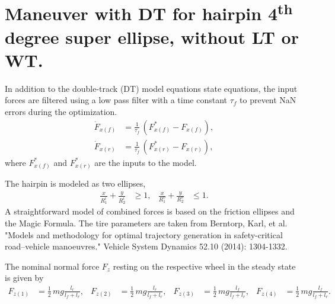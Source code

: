 \chapter[Double-Track Maneuver Optimization]{Maneuver with DT for hairpin 4\textsuperscript{th} degree super ellipse, without LT or WT.}

In addition to the double-track (DT) model equations state equations,
the input forces are filtered using a low pass filter with a time constant $\tau_f$ to prevent NaN errors during the optimization.
\begin{align}
    \dot F_{x(f)} &= \frac{1}{\tau_f}\,\left(F_{x(f)}^* - F_{x(f)}\right),\\
    \dot F_{x(r)} &= \frac{1}{\tau_f}\,\left(F_{x(r)}^* - F_{x(r)}\right),
\end{align}
where $F_{x(f)}^*$ and $F_{x(r)}^*$ are the inputs to the model.

The hairpin is modeled as two ellipses,
\begin{align}
    \frac{x}{R_1^i} + \frac{y}{R_2^i} & \geq 1, & \frac{x}{R_1^o} + \frac{y}{R_2^o} & \leq 1.
\end{align}
A straightforward model of combined forces is based on the friction ellipses and the Magic Formula. The tire parameters are taken from Berntorp, Karl, et al. "Models and methodology for optimal trajectory generation in safety-critical road–vehicle manoeuvres." Vehicle System Dynamics 52.10 (2014): 1304-1332.

The nominal normal force $F_z$ resting on the respective wheel in the steady state is given by
\begin{align}
    F_{z(1)} &= \frac{1}{2}\,mg\frac{l_r}{l_f+l_r}, & F_{z(2)} &= \frac{1}{2}\,mg\frac{l_r}{l_f+l_r}, & F_{z(3)} &= \frac{1}{2}\,mg\frac{l_f}{l_f+l_r}, & F_{z(4)} &= \frac{1}{2}\,mg\frac{l_f}{l_f+l_r}.
\end{align}

